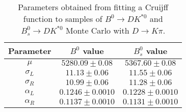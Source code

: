 \begin{table}[h]
  \centering
  \begin{tabular}{ccc}
      \toprule
      Parameter & $B^0$ value & $B^0_s$ value \\
      \midrule
      $\mu$ & $5280.09 \pm 0.08$ & $5367.60 \pm 0.08$ \\
      $\sigma_L$ & $11.13 \pm 0.06$ & $11.55 \pm 0.06$ \\
      $\sigma_R$ & $10.99 \pm 0.06$ & $11.28 \pm 0.06$ \\
      $\alpha_L$ & $0.1246 \pm 0.0010$ & $0.1228 \pm 0.0010$ \\
      $\alpha_R$ & $0.1137 \pm 0.0010$ & $0.1131 \pm 0.0010$ \\
  \bottomrule
  \end{tabular}
  \caption{Parameters obtained from fitting a Cruijff function to samples of $B^0 \to DK^{*0}$ and $B^0_s \to DK^{*0}$ Monte Carlo  with $D \to K\pi$.}
\label{tab:signal_MC_params}
\end{table}
